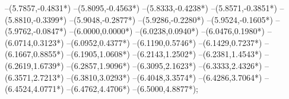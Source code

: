 {	--(5.7857,{-0.4831*\yskala})
	--(5.8095,{-0.4563*\yskala})
	--(5.8333,{-0.4238*\yskala})
	--(5.8571,{-0.3851*\yskala})
	--(5.8810,{-0.3399*\yskala})
	--(5.9048,{-0.2877*\yskala})
	--(5.9286,{-0.2280*\yskala})
	--(5.9524,{-0.1605*\yskala})
	--(5.9762,{-0.0847*\yskala})
	--(6.0000,{0.0000*\yskala})
	--(6.0238,{0.0940*\yskala})
	--(6.0476,{0.1980*\yskala})
	--(6.0714,{0.3123*\yskala})
	--(6.0952,{0.4377*\yskala})
	--(6.1190,{0.5746*\yskala})
	--(6.1429,{0.7237*\yskala})
	--(6.1667,{0.8855*\yskala})
	--(6.1905,{1.0608*\yskala})
	--(6.2143,{1.2502*\yskala})
	--(6.2381,{1.4543*\yskala})
	--(6.2619,{1.6739*\yskala})
	--(6.2857,{1.9096*\yskala})
	--(6.3095,{2.1623*\yskala})
	--(6.3333,{2.4326*\yskala})
	--(6.3571,{2.7213*\yskala})
	--(6.3810,{3.0293*\yskala})
	--(6.4048,{3.3574*\yskala})
	--(6.4286,{3.7064*\yskala})
	--(6.4524,{4.0771*\yskala})
	--(6.4762,{4.4706*\yskala})
	--(6.5000,{4.8877*\yskala});
}
